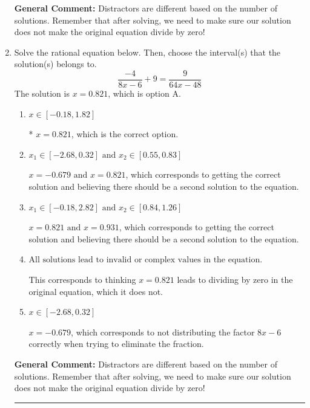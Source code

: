 \documentclass{extbook}[14pt]
\newcommand{\litem}[1]{\item #1

\rule{\textwidth}{0.4pt}}
\begin{document}
\begin{enumerate}
{\textbf{General Comment:} Distractors are different based on the number of solutions. Remember that after solving, we need to make sure our solution does not make the original equation divide by zero!
}
\litem{
Solve the rational equation below. Then, choose the interval(s) that the solution(s) belongs to.
\[ \frac{-4}{8x -6} + 9 = \frac{9}{64x -48} \]The solution is \( x = 0.821 \), which is option A.\begin{enumerate}[label=\Alph*.]
\item \( x \in [-0.18,1.82] \)

* $x = 0.821$, which is the correct option.
\item \( x_1 \in [-2.68, 0.32] \text{ and } x_2 \in [0.55,0.83] \)

$x = -0.679 \text{ and } x = 0.821$, which corresponds to getting the correct solution and believing there should be a second solution to the equation.
\item \( x_1 \in [-0.18, 2.82] \text{ and } x_2 \in [0.84,1.26] \)

$x = 0.821 \text{ and } x = 0.931$, which corresponds to getting the correct solution and believing there should be a second solution to the equation.
\item \( \text{All solutions lead to invalid or complex values in the equation.} \)

This corresponds to thinking $x = 0.821$ leads to dividing by zero in the original equation, which it does not.
\item \( x \in [-2.68,0.32] \)

$x = -0.679$, which corresponds to not distributing the factor $8x -6$ correctly when trying to eliminate the fraction.
\end{enumerate}

\textbf{General Comment:} Distractors are different based on the number of solutions. Remember that after solving, we need to make sure our solution does not make the original equation divide by zero!
}
\end{enumerate}
\end{document}
